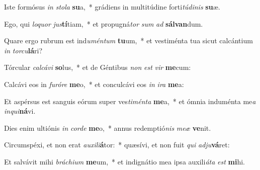 \item Iste formósus \textit{in} \textit{sto}\textit{la} \textbf{su}a,~* grádiens in multitúdine forti\textit{tú}\textit{di}\textit{nis} \textbf{su}æ.
\item Ego, qui \textit{lo}\textit{quor} \textit{jus}\textbf{tí}tiam,~* et propugná\textit{tor} \textit{sum} \textit{ad} \textbf{sál}\textbf{van}dum.
\item Quare ergo rubrum est ind\textit{u}\textit{mén}\textit{tum} \textbf{tu}um,~* et vestiménta tua sicut calcántium \textit{in} \textit{tor}\textit{cu}\textbf{lá}ri?
\item Tórcular \textit{cal}\textit{cá}\textit{vi} \textbf{so}lus,~* et de Géntibus \textit{non} \textit{est} \textit{vir} \textbf{me}cum:
\item Calcávi eos in \textit{fu}\textit{ró}\textit{re} \textbf{me}o,~* et conculcávi eos \textit{in} \textit{i}\textit{ra} \textbf{me}a:
\item Et aspérsus est sanguis eórum super ves\textit{ti}\textit{mén}\textit{ta} \textbf{me}a,~* et ómnia induménta me\textit{a} \textit{in}\textit{qui}\textbf{ná}vi.
\item Dies enim ultiónis \textit{in} \textit{cor}\textit{de} \textbf{me}o,~* annus redemptió\textit{nis} \textit{me}\textit{æ} \textbf{ve}nit.
\item Circumspéxi, et non erat \textit{au}\textit{xi}\textit{li}\textbf{á}tor:~* quæsívi, et non fuit \textit{qui} \textit{ad}\textit{ju}\textbf{vá}ret:
\item Et salvávit mihi \textit{brá}\textit{chi}\textit{um} \textbf{me}um,~* et indignátio mea ipsa auxili\textit{á}\textit{ta} \textit{est} \textbf{mi}hi.
